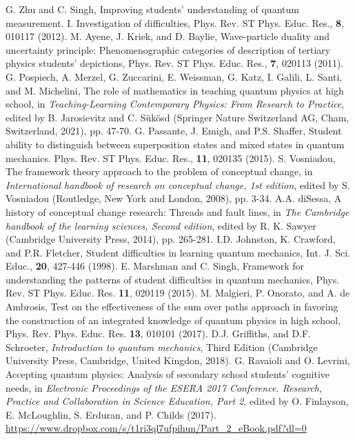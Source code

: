 \documentclass[twocolumn,secnumarabic,amssymb, nobibnotes, aps, prd, nofootinbib]{revtex4-2}
\begin{document}
\begin{thebibliography}{99}
 G. Zhu and C. Singh, Improving students' understanding of quantum measurement. I. Investigation of difficulties, Phys. Rev. ST Phys. Educ. Res., \textbf{8}, 010117 (2012).
 M. Ayene, J. Kriek, and D. Baylie, Wave-particle duality and uncertainty principle: Phenomenographic categories of description of tertiary physics students' depictions, Phys. Rev. ST Phys. Educ. Res., \textbf{7}, 020113 (2011).
 G. Pospiech, A. Merzel, G. Zuccarini, E. Weissman, G. Katz, I. Galili, L. Santi, and M. Michelini, The role of mathematics in teaching quantum physics at high school, in \textit{Teaching-Learning Contemporary Physics: From Research to Practice}, edited by B. Jarosievitz and C. S\"{u}k\"{o}sd (Springer Nature Switzerland AG, Cham, Switzerland, 2021), pp. 47-70.
 G. Passante, J. Emigh, and P.S. Shaffer, Student ability to distinguish between superposition states and mixed states in quantum mechanics. Phys. Rev. ST Phys. Educ. Res., \textbf{11}, 020135 (2015).
 S. Vosniadou, The framework theory approach to the problem of conceptual change, in  \textit{International handbook of research on conceptual change, 1st edition}, edited by S. Vosniadou (Routledge, New York and London, 2008), pp. 3-34.
 A.A. diSessa, A history of conceptual change research: Threads and fault lines, in \textit{The Cambridge handbook of the learning sciences, Second edition}, edited by R. K. Sawyer (Cambridge University Press, 2014), pp. 265-281.
 I.D. Johnston, K. Crawford, and P.R. Fletcher, Student difficulties in learning quantum mechanics, Int. J. Sci. Educ., \textbf{20}, 427-446 (1998).
 E. Marshman and C. Singh, Framework for understanding the patterns of student difficulties in quantum mechanics, Phys. Rev. ST Phys. Educ. Res. \textbf{11}, 020119 (2015).
 M. Malgieri, P. Onorato, and A. de Ambrosis, Test on the effectiveness of the sum over paths approach in favoring the construction of an integrated knowledge of quantum physics in high school, Phys. Rev. Phys. Educ. Res. \textbf{13}, 010101 (2017).
 D.J. Griffiths, and D.F. Schroeter, \textit{Introduction to quantum mechanics}, Third Edition (Cambridge University Press, Cambridge, United Kingdon, 2018).
 G. Ravaioli and O. Levrini, Accepting quantum physics: Analysis of secondary school students' cognitive needs, in \textit{Electronic Proceedings of the ESERA 2017 Conference. Research, Practice and Collaboration in Science Education, Part 2}, edited by O. Finlayson, E. McLoughlin, S. Erduran, and P. Childs (2017). \url{https://www.dropbox.com/s/t1ri3ql7ufpihun/Part_2_eBook.pdf?dl=0}

\end{thebibliography}
\end{document}
